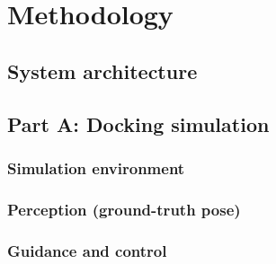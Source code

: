 \section{Methodology}


\subsection{System architecture}

\subsection{Part A: Docking simulation}

\subsubsection{Simulation environment}

\subsubsection{Perception (ground-truth pose)}

\subsubsection{Guidance and control}

